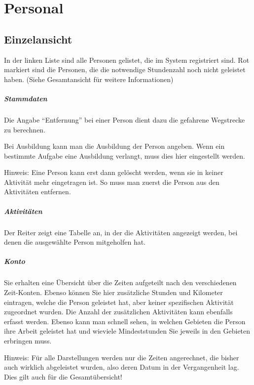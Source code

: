 \chapter{Personal}
\section{Einzelansicht}
In der linken Liste sind alle Personen gelistet, die im System registriert sind.
Rot markiert sind die Personen, die die notwendige Stundenzahl noch nicht geleistet haben.
(Siehe Gesamtansicht für weitere Informationen)


\paragraph{Stammdaten}
Die Angabe ``Entfernung'' bei einer Person dient dazu die gefahrene Wegstrecke zu berechnen.

Bei Ausbildung kann man die Ausbildung der Person angeben.
Wenn ein bestimmte Aufgabe eine Ausbildung verlangt, muss dies hier eingestellt werden.

Hinweis:
Eine Person kann erst dann gelöscht werden, wenn sie in keiner Aktivität mehr eingetragen ist.
So muss man zuerst die Person aus den Aktivitäten entfernen.


\paragraph{Aktivitäten}
Der Reiter zeigt eine Tabelle an, in der die Aktivitäten angezeigt werden, bei denen die ausgewählte Person mitgeholfen hat.


\paragraph{Konto}
Sie erhalten eine Übersicht über die Zeiten aufgeteilt nach den verschiedenen Zeit-Konten.
Ebenso können Sie hier zusätzliche Stunden und Kilometer eintragen, welche die Person geleistet hat, aber keiner spezifischen Aktivität zugeordnet wurden.
Die Anzahl der zusätzlichen Aktivitäten kann ebenfalls erfasst werden.
Ebenso kann man schnell sehen, in welchen Gebieten die Person ihre Arbeit geleistet hat und wieviele Mindeststunden Sie jeweils in den Gebieten erbringen muss.


Hinweis:
Für alle Darstellungen werden nur die Zeiten angerechnet, die bisher auch wirklich abgeleistet wurden, also deren Datum in der Vergangenheit lag.
Dies gilt auch für die Gesamtübersicht!


